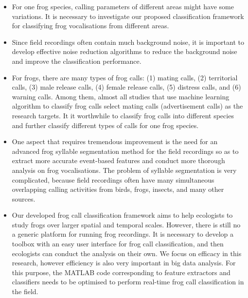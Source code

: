 \begin{itemize}

\item For one frog species, calling parameters of different areas might have some variations. It is necessary to investigate our proposed classification framework for classifying frog vocalisations from different areas.

\item Since field recordings often contain much background noise, it is important to develop effective noise reduction algorithms to reduce the background noise and improve the classification performance.


\item For frogs, there are many types of frog calls: (1) mating calls, (2) territorial calls, (3) male release calls, (4) female release calls, (5) distress calls, and (6) warning calls. Among them, almost all studies that use machine learning algorithm to classify frog calls select mating calls (advertisement calls) as the research targets. It it worthwhile to classify frog calls into different species and further classify different types of calls for one frog species.



\item  One aspect that requires tremendous improvement is the need for an advanced frog syllable segmentation method for the field recordings so as to extract more accurate event-based features and conduct more thorough analysis on frog vocalisations. The problem of syllable segmentation is very complicated, because field recordings often have many simultaneous overlapping calling activities from birds, frogs, insects, and many other sources. 


\item Our developed frog call classification framework aims to help ecologists to study frogs over larger spatial and temporal scales. However, there is still no a generic platform for running frog recordings. It is necessary to develop a toolbox with an easy user interface for frog call classification, and then ecologists can conduct the analysis on their own. We focus on efficacy in this research, however efficiency is also very important in big data analysis. For this purpose, the MATLAB code corresponding to feature extractors and classifiers needs to be optimised to perform real-time frog call classification in the field.


\end{itemize}










